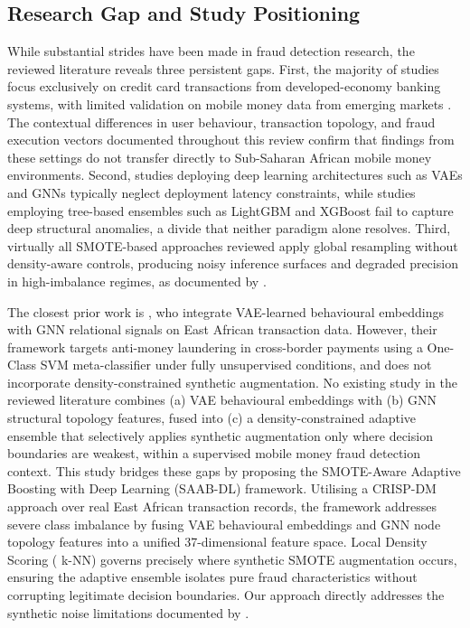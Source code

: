 \documentclass[a4paper,fleqn]{cas-sc}
\begin{document}
\subsection{Research Gap and Study Positioning}

While substantial strides have been made in fraud detection research, the reviewed literature reveals three persistent gaps. First, the majority of studies focus exclusively on credit card transactions from developed-economy banking systems, with limited validation on mobile money data from emerging markets \cite{George2023Systematic}. The contextual differences in user behaviour, transaction topology, and fraud execution vectors documented throughout this review confirm that findings from these settings do not transfer directly to Sub-Saharan African mobile money environments. Second, studies deploying deep learning architectures such as VAEs and GNNs typically neglect deployment latency constraints, while studies employing tree-based ensembles such as LightGBM and XGBoost fail to capture deep structural anomalies, a divide that neither paradigm alone resolves. Third, virtually all SMOTE-based approaches reviewed apply global resampling without density-aware controls, producing noisy inference surfaces and degraded precision in high-imbalance regimes, as documented by \cite{Kurnia2026CostSensitive}.

The closest prior work is \cite{kungu2026hybrid}, who integrate VAE-learned behavioural embeddings with GNN relational signals on East African transaction data. However, their framework targets anti-money laundering in cross-border payments using a One-Class SVM meta-classifier under fully unsupervised conditions, and does not incorporate density-constrained synthetic augmentation. No existing study in the reviewed literature combines (a) VAE behavioural embeddings with (b) GNN structural topology features, fused into (c) a density-constrained adaptive ensemble that selectively applies synthetic augmentation only where decision boundaries are weakest, within a supervised mobile money fraud detection context.
This study bridges these gaps by proposing the SMOTE-Aware Adaptive Boosting with Deep Learning (SAAB-DL) framework. Utilising a CRISP-DM approach over real East African transaction records, the framework addresses severe class imbalance by fusing VAE behavioural embeddings and GNN node topology features into a unified 37-dimensional feature space. Local Density Scoring (
k-NN) governs precisely where synthetic SMOTE augmentation occurs, ensuring the adaptive ensemble isolates pure fraud characteristics without corrupting legitimate decision boundaries. Our approach directly addresses the synthetic noise limitations documented by \cite{Bonde2025Improving}.
\end{document}

